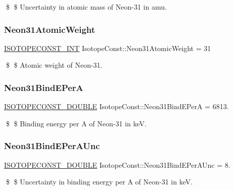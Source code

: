 \$ \$ Uncertainty in atomic mass of Neon-\/31 in amu. \mbox{\label{group___isotope_const-_neon-_ne31_ga8a0d9f4ed380d73584edfab5afca875e}} 
\subsubsection{\texorpdfstring{Neon31\+Atomic\+Weight}{Neon31AtomicWeight}}
{\footnotesize\ttfamily \mbox{\hyperlink{group___isotope_const-_macros_ga5f18360b3e99483a35c32d789e62621c}{I\+S\+O\+T\+O\+P\+E\+C\+O\+N\+S\+T\+\_\+\+I\+NT}} Isotope\+Const\+::\+Neon31\+Atomic\+Weight = 31}

\$ \$ Atomic weight of Neon-\/31. \mbox{\label{group___isotope_const-_neon-_ne31_gabe1eb51dbc80b4126f58d905dde73b38}} 
\subsubsection{\texorpdfstring{Neon31\+Bind\+E\+PerA}{Neon31BindEPerA}}
{\footnotesize\ttfamily \mbox{\hyperlink{group___isotope_const-_macros_ga8f45a7272ce02c0b4c65c44636ed719a}{I\+S\+O\+T\+O\+P\+E\+C\+O\+N\+S\+T\+\_\+\+D\+O\+U\+B\+LE}} Isotope\+Const\+::\+Neon31\+Bind\+E\+PerA = 6813.}

\$ \$ Binding energy per A of Neon-\/31 in keV. \mbox{\label{group___isotope_const-_neon-_ne31_ga1ea5e3e2efa57a51d1914dc104c42bdc}} 
\subsubsection{\texorpdfstring{Neon31\+Bind\+E\+Per\+A\+Unc}{Neon31BindEPerAUnc}}
{\footnotesize\ttfamily \mbox{\hyperlink{group___isotope_const-_macros_ga8f45a7272ce02c0b4c65c44636ed719a}{I\+S\+O\+T\+O\+P\+E\+C\+O\+N\+S\+T\+\_\+\+D\+O\+U\+B\+LE}} Isotope\+Const\+::\+Neon31\+Bind\+E\+Per\+A\+Unc = 8.}

\$ \$ Uncertainty in binding energy per A of Neon-\/31 in keV. \mbox{\label{group___isotope_const-_neon-_ne31_ga06c9088d1dee01aa9aacd40ddd4807df}} 

